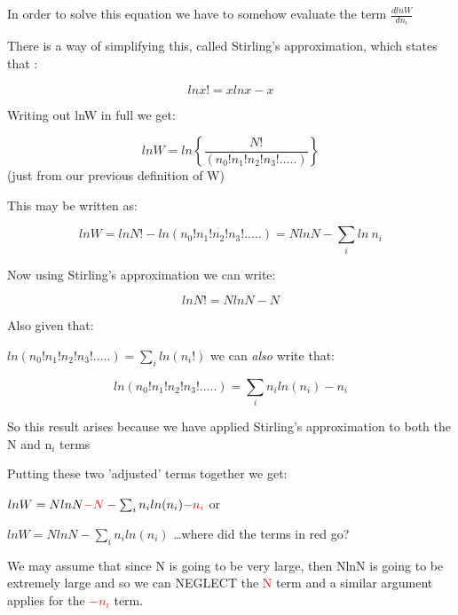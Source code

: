 \documentclass[a4paper,12pt,titlepage]{article}
\begin{document}
\begin{frame}[allowframebreaks=0.7]
In order to solve this equation we have to somehow evaluate the term 
\( \frac{dlnW}{dn_i}\)\par\medskip
 
There is a way of simplifying this, called Stirling's approximation, which states that :\par\medskip
 
\[lnx! = xlnx - x\]\par\medskip
 
Writing out lnW in full we get:\par\medskip
 
\[lnW   = ln\left\{\frac{N!}{(n_0!  n_1!  n_2!  n_3! …..)} \right\} \]  (just from our previous definition of W)

This may be written as:

\[lnW   = lnN! - ln(n_0!  n_1!  n_2!  n_3! …..) = NlnN - \sum_i ln\ n_i\] 
 
Now using Stirling's approximation we can write:
 
\[lnN! = NlnN - N\]
\end{frame}

\begin{frame}[allowframebreaks]
Also given that:\par\medskip
 
\(ln(n_0!  n_1!  n_2!  n_3! …..)      = \sum_i ln (n_i!)\) \hspace{1cm}        we can \textit{also} write that:\par
 
\[ln(n_0!  n_1!  n_2!  n_3! …..)      = \sum_i n_i ln(n_i)  - n_i   \]

So this result arises because we have applied Stirling's approximation to both the N and n\(_i\) terms\par\medskip
 
Putting these two 'adjusted’ terms together we get:\par\medskip

\(lnW = NlnN \textcolor{red}{- N}    - \sum_i n_i ln(n_i)  \textcolor{red}{- n_i}\)     \hspace{1cm} or\par\medskip
 
\(lnW = NlnN - \sum_i n_i ln(n_i)\) \hspace{0.5cm}  …where did the terms in red go?\par\medskip

We may assume that since N is going to be very large, then NlnN is going to be extremely large and so we can NEGLECT the \textcolor{red}{N} term and a similar argument applies for  the \textcolor{red}{\(-n_i\)}  term. 
\end{frame}
\end{document}
